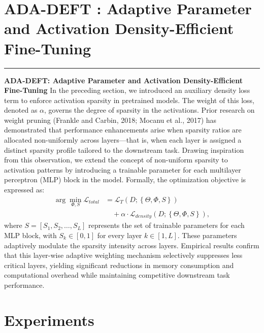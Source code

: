 \documentclass[10pt,twocolumn]{article}
\begin{document}
\section{ADA-DEFT : Adaptive Parameter and Activation Density-Efficient Fine-Tuning}

\vspace{1em} \hrule \vspace{1em}
\textbf{ADA-DEFT: Adaptive Parameter and Activation Density-Efficient Fine-Tuning} In the preceding section, we introduced an auxiliary density loss term to enforce activation sparsity in pretrained models. The weight of this loss, denoted as \(\alpha\), governs the degree of sparsity in the activations. Prior research on weight pruning (Frankle and Carbin, 2018; Mocanu et al., 2017) has demonstrated that performance enhancements arise when sparsity ratios are allocated non-uniformly across layers—that is, when each layer is assigned a distinct sparsity profile tailored to the downstream task. Drawing inspiration from this observation, we extend the concept of non-uniform sparsity to activation patterns by introducing a trainable parameter for each multilayer perceptron (MLP) block in the model. Formally, the optimization objective is expressed as:
\[\begin{aligned}
\arg\min_{\Phi,S} \mathcal{L}_{total} &= \mathcal{L}_{T}\left(D;\left\{\Theta,\Phi,S\right\}\right) \\
&\quad + \alpha \cdot \mathcal{L}_{density}\left(D;\left\{\Theta,\Phi,S\right\}\right),
\end{aligned}\]
where \(S = [S_{1}, S_{2}, \ldots, S_{L}]\) represents the set of trainable parameters for each MLP block, with \(S_{k} \in [0, 1]\) for every layer \(k \in [1, L]\). These parameters adaptively modulate the sparsity intensity across layers. Empirical results confirm that this layer-wise adaptive weighting mechanism selectively suppresses less critical layers, yielding significant reductions in memory consumption and computational overhead while maintaining competitive downstream task performance.




\section{Experiments}
\end{document}
